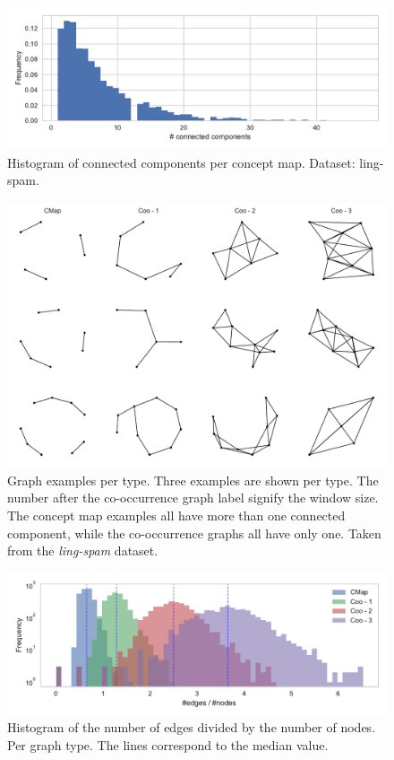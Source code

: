 \begin{figure}[ht]
\centering
\includegraphics[width=0.8\linewidth]{assets/figures/hist-connected-components-ling-spam-CMap.pdf}
\caption{Histogram of connected components per concept map. Dataset: ling-spam.}\label{fig:histogram_connected_components}
\end{figure}

\begin{figure}[ht]
\centering
\includegraphics[width=0.6\linewidth]{assets/figures/graph-examples.pdf}
\caption{Graph examples per type. Three examples are shown per type. The number after the co-occurrence graph label signify the window size. The concept map examples all have more than one connected component, while the co-occurrence graphs all have only one. Taken from the \textit{ling-spam} dataset.}\label{fig:graph_examples}
\end{figure}

\begin{figure}[ht]
\centering
\includegraphics[width=0.7\linewidth]{assets/figures/hist-edgesnodes.pdf}
\caption{Histogram of the number of edges divided by the number of nodes. Per graph type. The lines correspond to the median value.}
\label{fig:histogram-edges-div-nodes-per-type}
\end{figure}


